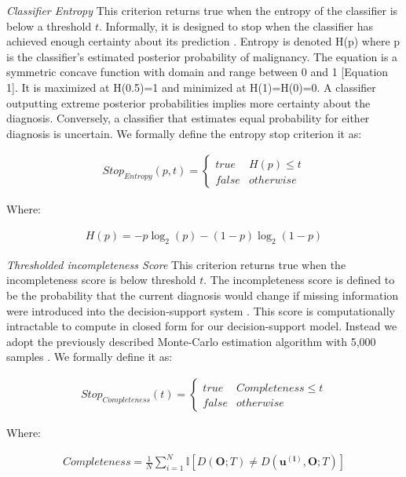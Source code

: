 \emph{Classifier Entropy}
This criterion returns true when the entropy of the classifier is below a threshold $t$.
Informally, it is designed to stop when the classifier has achieved enough certainty about its prediction \cite{MacKay:2003wc}.
Entropy is denoted H(p) where p is the classifier's estimated posterior probability of malignancy.
The equation is a symmetric concave function with domain and range between  0 and 1 [Equation 1].
It is maximized at H(0.5)=1 and minimized at H(1)=H(0)=0.
A classifier outputting extreme posterior probabilities implies more certainty about the diagnosis.
Conversely, a classifier that estimates equal probability for either diagnosis is uncertain.
We formally define the entropy stop criterion it as:

\begin{align}
Stop_{Entropy}(p,t) =
\begin{cases} 
true & H(p)\leq t \\
false & otherwise
\end{cases}
\end{align}

Where:

\begin{align}
H(p) = -p\log_2(p) - (1-p)\log_2(1-p)
\end{align}


\emph{Thresholded incompleteness Score}
This criterion returns true when the incompleteness score is below threshold $t$.
The incompleteness score is defined to be the probability that the current diagnosis would change if missing information were introduced into the decision-support system \cite{Gimenez:2014tr}.
This score is computationally intractable to compute in closed form for our decision-support model.
Instead we adopt the previously described Monte-Carlo estimation algorithm with 5,000 samples \cite{Gimenez:2014tr}.
We formally define it as:

\begin{align}
Stop_{Completeness}(t) =
\begin{cases} 
true & Completeness \leq t \\
false & otherwise
\end{cases}
\end{align}

Where:

\begin{align}
Completeness = \frac{1}{N}\sum_{i =1 }^{N}\mathbb{I}\left[D(\mathbf{O};T) \neq D(\mathbf{u^{(i)}},\mathbf{O};T)\right]
\end{align}


